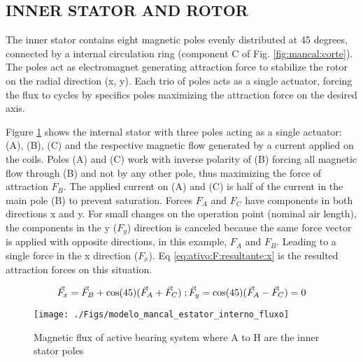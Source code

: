 \documentclass[10pt,fleqn,a4paper,twoside]{article}
\begin{document}
%	
	
	\subsection{\uppercase{Inner stator and Rotor}}
	
	The inner stator contains eight magnetic poles evenly distributed at 45 degrees, connected by a internal circulation ring (component C of Fig. \ref{fig:mancal:corte}). The poles act as electromagnet generating attraction force to stabilize the rotor on the radial direction (x, y). Each trio of poles acts as a single actuator, forcing the flux to cycles by specifics poles maximizing the attraction force on the desired axis.
	
	Figure \ref{fig:modelo:mancal:estator:interno:fluxo} shows the internal stator with three poles acting as a single actuator: (A), (B), (C) and the respective magnetic flow generated by a current applied on the coils. Poles (A) and (C) work with inverse polarity of (B) forcing all magnetic flow through (B) and not by any other pole, thus maximizing the force of attraction $F_B$. The applied current on (A) and (C) is half of the current in the main pole (B) to prevent saturation.	Forces $F_A$ and $F_C$  have components in both directions x and y. For small changes on the operation point (nominal air length), the components in the y ($F_y$) direction is canceled because the same force vector is applied with opposite directions, in this example, $F_A$ and $F_B$. Leading to a single force in the x direction ($F_x$). Eq \ref{eq:ativo:F:resultante:x} is the resulted attraction forces on this situation.	
	
	\begin{equation}
		\vec{F}_x = \vec{F}_B + \cos(45) (\vec{F}_{A} + \vec{F}_{C}) \; ;\\
		\vec{F}_y =  \cos(45) (\vec{F}_{A} - \vec{F}_{C}) = 0 \label{eq:ativo:F:resultante:x}
	\end{equation}	
	

	
	\begin{figure}[ht]
		\centering
		\texttt{[image: ./Figs/modelo\_mancal\_estator\_interno\_fluxo]}
		\caption{Magnetic flux of active bearing system where A to H are the inner stator poles}
		\label{fig:modelo:mancal:estator:interno:fluxo}
	\end{figure}
	
\end{document}
